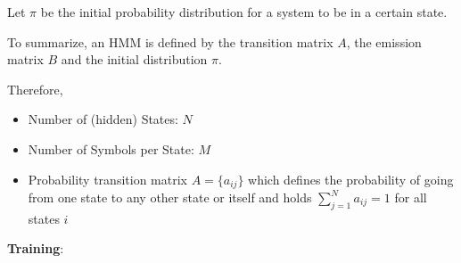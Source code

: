 \documentclass[a4paper, oneside]{csthesis}
\begin{document}
Let $\pi$ be the initial probability distribution for a system to be in a certain state.

To summarize, an HMM is defined by the transition matrix $A$, the emission matrix $B$ and the initial distribution $\pi$.


Therefore,

\begin{itemize}
\item Number of (hidden) States: $N$
\item Number of Symbols per State: $M$
\item Probability transition matrix $A = \{a_{ij}\}$ which defines the probability of going from one state to any other state or itself and holds $\sum_{j=1}^{N} a_{ij} = 1$ for all states $i$
\end{itemize}



\textbf{Training}:






\end{document}
